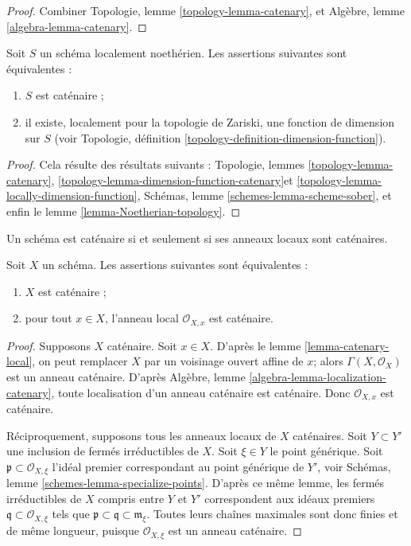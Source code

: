 \begin{proof}
Combiner Topologie, lemme \ref{topology-lemma-catenary}, et
Algèbre, lemme \ref{algebra-lemma-catenary}.
\end{proof}

\begin{lemma}
\label{lemma-catenary-dimension-function}
Soit $S$ un schéma localement noethérien. Les
assertions suivantes sont équivalentes :
\begin{enumerate}
\item $S$ est caténaire ;
\item il existe, localement pour la topologie de Zariski, une fonction de dimension
sur $S$ (voir Topologie, définition \ref{topology-definition-dimension-function}).
\end{enumerate}
\end{lemma}

\begin{proof}
Cela résulte des résultats
suivants : Topologie, lemmes
\ref{topology-lemma-catenary},
\ref{topology-lemma-dimension-function-catenary}et
\ref{topology-lemma-locally-dimension-function},
Schémas, lemme \ref{schemes-lemma-scheme-sober},
et enfin le lemme \ref{lemma-Noetherian-topology}.
\end{proof}

\noindent
Un schéma est caténaire si et seulement si ses anneaux
locaux sont caténaires.

\begin{lemma}
\label{lemma-catenary-local-rings-catenary}
Soit $X$ un schéma. Les assertions suivantes sont équivalentes :
\begin{enumerate}
\item $X$ est caténaire ;
\item pour tout $x \in X$, l'anneau local $\mathcal{O}_{X, x}$ est
caténaire.
\end{enumerate}
\end{lemma}

\begin{proof}
Supposons $X$ caténaire. Soit $x \in X$. D'après le lemme \ref{lemma-catenary-local},
on peut remplacer $X$ par un voisinage ouvert affine de $x$;
alors $\Gamma(X, \mathcal{O}_X)$ est un anneau caténaire.
D'après Algèbre, lemme \ref{algebra-lemma-localization-catenary},
toute localisation d'un anneau caténaire
est caténaire. Donc $\mathcal{O}_{X, x}$ est caténaire.

\medskip\noindent
Réciproquement, supposons tous les anneaux locaux de $X$ caténaires.
Soit $Y \subset Y'$ une inclusion de fermés
irréductibles de $X$. Soit $\xi \in Y$ le point générique.
Soit $\mathfrak p \subset \mathcal{O}_{X, \xi}$ l'idéal
premier correspondant au point générique de $Y'$, voir
Schémas, lemme \ref{schemes-lemma-specialize-points}. D'après ce
même lemme, les fermés irréductibles de $X$ compris entre $Y$ et $Y'$
correspondent aux idéaux premiers $\mathfrak q \subset \mathcal{O}_{X, \xi}$
tels que $\mathfrak p \subset \mathfrak q \subset \mathfrak m_{\xi}$.
Toutes leurs chaînes maximales sont donc finies et de même
longueur, puisque $\mathcal{O}_{X, \xi}$ est un anneau caténaire.
\end{proof}






